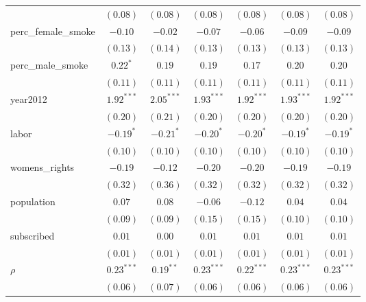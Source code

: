 \begin{table}[!h]
\begin{center}
\begin{tabular}{l c c c c c c }
                        & $(0.08)$     & $(0.08)$     & $(0.08)$     & $(0.08)$     & $(0.08)$     & $(0.08)$     \\
perc\_female\_smoke     & $-0.10$      & $-0.02$      & $-0.07$      & $-0.06$      & $-0.09$      & $-0.09$      \\
                        & $(0.13)$     & $(0.14)$     & $(0.13)$     & $(0.13)$     & $(0.13)$     & $(0.13)$     \\
perc\_male\_smoke       & $0.22^{*}$   & $0.19$       & $0.19$       & $0.17$       & $0.20$       & $0.20$       \\
                        & $(0.11)$     & $(0.11)$     & $(0.11)$     & $(0.11)$     & $(0.11)$     & $(0.11)$     \\
year2012                & $1.92^{***}$ & $2.05^{***}$ & $1.93^{***}$ & $1.92^{***}$ & $1.93^{***}$ & $1.92^{***}$ \\
                        & $(0.20)$     & $(0.21)$     & $(0.20)$     & $(0.20)$     & $(0.20)$     & $(0.20)$     \\
labor                   & $-0.19^{*}$  & $-0.21^{*}$  & $-0.20^{*}$  & $-0.20^{*}$  & $-0.19^{*}$  & $-0.19^{*}$  \\
                        & $(0.10)$     & $(0.10)$     & $(0.10)$     & $(0.10)$     & $(0.10)$     & $(0.10)$     \\
womens\_rights          & $-0.19$      & $-0.12$      & $-0.20$      & $-0.20$      & $-0.19$      & $-0.19$      \\
                        & $(0.32)$     & $(0.36)$     & $(0.32)$     & $(0.32)$     & $(0.32)$     & $(0.32)$     \\
population              & $0.07$       & $0.08$       & $-0.06$      & $-0.12$      & $0.04$       & $0.04$       \\
                        & $(0.09)$     & $(0.09)$     & $(0.15)$     & $(0.15)$     & $(0.10)$     & $(0.10)$     \\
subscribed              & $0.01$       & $0.00$       & $0.01$       & $0.01$       & $0.01$       & $0.01$       \\
                        & $(0.01)$     & $(0.01)$     & $(0.01)$     & $(0.01)$     & $(0.01)$     & $(0.01)$     \\
$\rho$                  & $0.23^{***}$ & $0.19^{**}$  & $0.23^{***}$ & $0.22^{***}$ & $0.23^{***}$ & $0.23^{***}$ \\
                        & $(0.06)$     & $(0.07)$     & $(0.06)$     & $(0.06)$     & $(0.06)$     & $(0.06)$     \\

\end{tabular}
\end{center}
\end{table}

